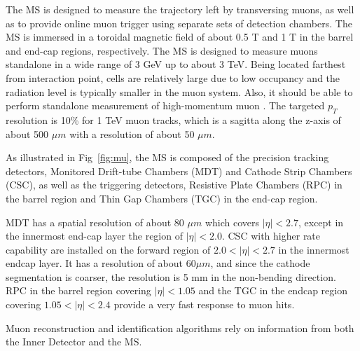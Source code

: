 \par The MS \cite{CERN-LHCC-97-022} is designed to measure the trajectory left by transversing muons, as well as to provide online muon trigger using separate sets of detection chambers. The MS is immersed in a toroidal magnetic field of about 0.5 T and 1 T in the barrel and end-cap regions, respectively. The MS is designed to measure muons standalone in a wide range of 3 GeV up to about 3 TeV. 
Being located farthest from interaction point, cells are relatively large due to low occupancy and the radiation level is typically 
smaller in the muon system. 
Also, it should be able to perform standalone measurement of high-momentum muon \cite{muon}.
The targeted $p_T$ resolution is 10\% for 1 TeV muon tracks, which is a sagitta along the z-axis of about 500 $\mu m$ with a resolution of about 50 $\mu m$.
\par As illustrated in Fig~\ref{fig:mu}, the MS is composed of the precision tracking detectors, Monitored Drift-tube Chambers (MDT) and Cathode Strip Chambers (CSC), as well as the triggering detectors, Resistive Plate Chambers (RPC) in the barrel region and Thin Gap Chambers (TGC) in the end-cap region.
\par MDT has a spatial resolution of about 80 $\mu m$ which covers $|\eta| < 2.7$, except in the innermost end-cap layer the region of $|\eta| < 2.0$. CSC with higher rate capability are installed on the forward region of $2.0 < |\eta| < 2.7$ in the innermost endcap layer. It has a resolution of about 60$\mu m$, and since the cathode segmentation is coarser, the resolution is 5 mm in the non-bending direction.	RPC in the barrel region covering $|\eta| < 1.05$ and the TGC in the endcap region covering $1.05 < |\eta| < 2.4$ provide a very fast response to muon hits.

\par Muon reconstruction and identification algorithms rely on information from both the Inner Detector and the MS.

